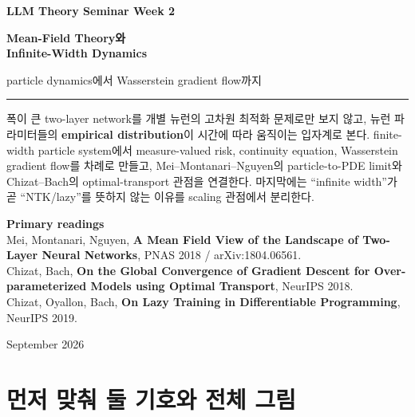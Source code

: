 \documentclass[11pt,a4paper,oneside,openany]{memoir}
\theoremstyle{definition}
\begin{document}
\begin{titlingpage}
\thispagestyle{empty}
\vspace*{1.2cm}
{\small\bfseries LLM Theory Seminar \hfill Week 2\par}
\vspace{1.4cm}
{\HUGE\bfseries Mean-Field Theory와\\[0.18em]Infinite-Width Dynamics\par}
\vspace{0.55cm}
{\large particle dynamics에서 Wasserstein gradient flow까지\par}
\vspace{0.9cm}
\rule{\textwidth}{0.7pt}
\vspace{1.1cm}

\begin{minipage}{0.86\textwidth}
\small
폭이 큰 two-layer network를 개별 뉴런의 고차원 최적화 문제로만 보지 않고,
뉴런 파라미터들의 \textbf{empirical distribution}이 시간에 따라 움직이는 입자계로 본다.
finite-width particle system에서 measure-valued risk, continuity equation, Wasserstein gradient
flow를 차례로 만들고, Mei--Montanari--Nguyen의 particle-to-PDE limit와 Chizat--Bach의
optimal-transport 관점을 연결한다. 마지막에는 ``infinite width''가 곧 ``NTK/lazy''를
뜻하지 않는 이유를 scaling 관점에서 분리한다.
\end{minipage}

\vfill
{\small
\textbf{Primary readings}\\[0.25em]
Mei, Montanari, Nguyen, \textbf{A Mean Field View of the Landscape of Two-Layer Neural Networks}, PNAS 2018 / arXiv:1804.06561.\\
Chizat, Bach, \textbf{On the Global Convergence of Gradient Descent for Over-parameterized Models using Optimal Transport}, NeurIPS 2018.\\
Chizat, Oyallon, Bach, \textbf{On Lazy Training in Differentiable Programming}, NeurIPS 2019.
\par}
\vspace{0.8cm}
{\small September 2026\par}
\end{titlingpage}

\tableofcontents*
\clearpage

\chapter{먼저 맞춰 둘 기호와 전체 그림}
\end{document}
